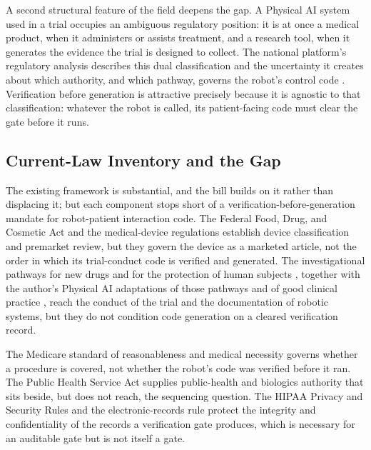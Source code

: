 A second structural feature of the field deepens the gap. A Physical AI system
used in a trial occupies an ambiguous regulatory position: it is at once a
medical product, when it administers or assists treatment, and a research tool,
when it generates the evidence the trial is designed to collect. The national
platform's regulatory analysis describes this dual classification and the
uncertainty it creates about which authority, and which pathway, governs the
robot's control code \cite{kawchak2026national}. Verification before generation
is attractive precisely because it is agnostic to that classification: whatever
the robot is called, its patient-facing code must clear the gate before it runs.

\subsection{Current-Law Inventory and the Gap}

The existing framework is substantial, and the bill builds on it rather than
displacing it; but each component stops short of a verification-before-generation
mandate for robot-patient interaction code. The Federal Food, Drug, and Cosmetic
Act \cite{usc-fdca} and the medical-device regulations \cite{cfr-devices}
establish device classification and premarket review, but they govern the device
as a marketed article, not the order in which its trial-conduct code is verified
and generated. The investigational pathways for new drugs and for the protection
of human subjects \cite{cfr-part312, cfr-part50}, together with the author's
Physical AI adaptations of those pathways and of good clinical practice
\cite{kawchak2026cfr312, kawchak2026cfr50, kawchak2026iche6r3}, reach the conduct
of the trial and the documentation of robotic systems, but they do not condition
code generation on a cleared verification record. 

The Medicare standard of
reasonableness and medical necessity \cite{usc-1395y} governs whether a procedure
is covered, not whether the robot's code was verified before it ran. The Public
Health Service Act \cite{usc-phsa} supplies public-health and biologics
authority that sits beside, but does not reach, the sequencing question. The
HIPAA Privacy and Security Rules \cite{cfr-hipaa} and the electronic-records rule
\cite{cfr-part11} protect the integrity and confidentiality of the records a
verification gate produces, which is necessary for an auditable gate but is not
itself a gate.

